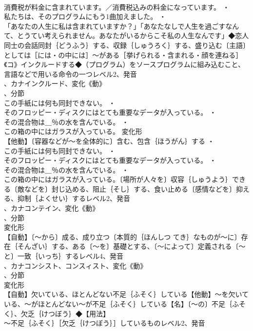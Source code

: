 \documentclass[8pt]{extreport}
\begin{document}
\begin{CJK}{UTF8}{min}
\\	消費税が料金に含まれています。／消費税込みの料金になっています。 ・
\\	私たちは、そのプログラムにもう1曲加えました。 ・
\\	「あなたの人生に私は含まれていますか？」「あなたなしで人生を過ごすなんて、とうてい考えられません。あなたがいるからこそ私の人生なんです」◆恋人同士の会話同封｛どうふう｝する、収録｛しゅうろく｝する、盛り込む〔主語〕としては［には・の中には］～がある［挙げられる・含まれる・顔を連ねる］《コ》インクルードする◆（プログラム）をソースプログラムに組み込むこと、
\\	言語などで用いる命令の一つレベル2、発音
\\	、カナインクルード、変化《動》
\\	、分節
\\	この手紙には何も同封できない。 ・
\\	そのフロッピー・ディスクにはとても重要なデータが入っている。 ・
\\	その混合物は＿％の水を含んでいる。 ・
\\	この箱の中にはガラスが入っている。	変化形 
\\	【他動】〔容器などが～を全体的に〕含む、包含｛ほうがん｝する ・
\\	この手紙には何も同封できない。 ・
\\	そのフロッピー・ディスクにはとても重要なデータが入っている。 ・
\\	その混合物は＿％の水を含んでいる。 ・
\\	この箱の中にはガラスが入っている。〔場所が人々を〕収容｛しゅうよう｝できる〔敵などを〕封じ込める、阻止｛そし｝する、食い止める〔感情などを〕抑える、抑制｛よくせい｝するレベル2、発音
\\	、カナコンテイン、変化《動》
\\	、分節
\\	変化形 
\\	【自動】〔～から〕成る、成り立つ〔本質的｛ほんしつ てき｝なものが～に〕存在｛そんざい｝する、ある〔～を〕基礎とする、〔～によって〕定義される〔～と〕一致｛いっち｝するレベル4、発音
\\	、カナコンシスト、コンスィスト、変化《動》
\\	、分節
\\	変化形 
\\	【自動】欠いている、ほとんどない不足｛ふそく｝している【他動】～を欠いている、～がほとんどない～が不足｛ふそく｝している【名】〔～の〕不足｛ふそく｝、欠乏｛けつぼう｝◆【用法】
\\	～不足｛ふそく｝［欠乏｛けつぼう｝］しているものレベル2、発音

\end{CJK}
\end{document}
